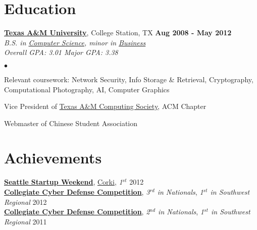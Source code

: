 \documentclass[margin,line]{res}
\newenvironment{list2}
  {\vspace{-4mm}
   \begin{list}{$\bullet$}{
     \setlength{\itemsep}{0in}
     \setlength{\parsep}{0in} \setlength{\parskip}{0in}
     \setlength{\topsep}{0in} \setlength{\partopsep}{0in}
     \setlength{\leftmargin}{0.18in}}}
  {\end{list}}
\begin{document}
\begin{resume}
\section{\sc Education}
{\bf \href{http://tamu.edu}{Texas A\&M University}}, College Station, TX \hfill {\bf Aug 2008 - May 2012} \\
{\em B.S. in \href{http://cs.tamu.edu}{Computer Science}, minor in \href{http://mays.tamu.edu}{Business}} \\
{\em Overall GPA: 3.01 \hspace{5mm} Major GPA: 3.38} \\
\begin{list2}
\item Relevant coursework: Network Security, Info Storage \& Retrieval,
 Cryptography, Computational Photography, AI, Computer Graphics
\item Vice President of \href{http://tacs.tamu.edu}{Texas A\&M Computing Society}, ACM Chapter
\item Webmaster of Chinese Student Association
\end{list2}


%
%
\section{\sc Achievements}
{\bf \href{http://seattle.startupweekend.org/}{Seattle Startup Weekend}}, \href{http://seattle.startupweekend.org/2012/11/26/seattle-startup-weekend-global-startup-battle-edition-winners-more/}{Corki},  {\em 1$^{st}$} \hfill 2012 \\
{\bf \href{http://www.nationalccdc.org/}{Collegiate Cyber Defense Competition}}, {\em 3$^{rd}$ in Nationals}, {\em 1$^{st}$ in Southwest Regional}  \hfill 2012 \\
{\bf \href{http://www.nationalccdc.org/}{Collegiate Cyber Defense Competition}}, {\em 2$^{nd}$ in Nationals}, {\em 1$^{st}$ in Southwest Regional}  \hfill 2011 \\
\vspace*{-5mm}



\end{resume}
\end{document}
